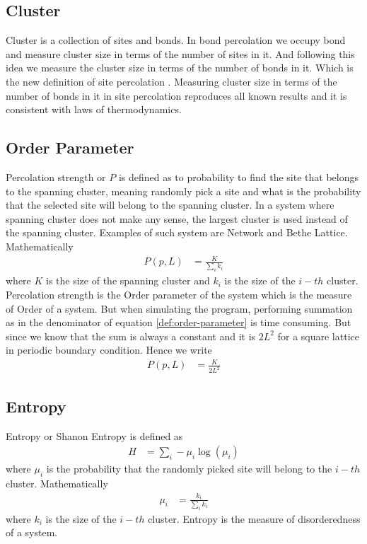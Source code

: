 	\subsection{Cluster}
	Cluster is a collection of sites and bonds. In bond percolation we occupy bond and measure cluster size in terms of the number of sites in it. And following this idea we measure the cluster size in terms of the number of bonds in it. Which is the new definition of site percolation \cite{redefinition-of-site-percolation}. Measuring cluster size in terms of the number of bonds in it in site percolation reproduces all known results and it is consistent with laws of thermodynamics.

	\subsection{Order Parameter}
	Percolation strength or $P$ is defined as to probability to find the site that belongs to the spanning cluster, meaning randomly pick a site and what is the probability that the selected site will belong to the spanning cluster. In a system where spanning cluster does not make any sense, the largest cluster is used instead of the spanning cluster. Examples of such system are Network and Bethe Lattice. Mathematically
	\begin{align}
		P(p,L) &= \frac{K}{\sum_{i} k_i}
		\label{def:order-parameter}
	\end{align}
	where $K$ is the size of the spanning cluster and $k_i$ is the size of the $i-th$ cluster.
	Percolation strength is the Order parameter of the system which is the measure of Order of a system.
	But when simulating the program, performing summation as in the denominator of equation \ref{def:order-parameter} is time consuming. But since we know that the sum is always a constant and it is $2 L^2$ for a square lattice in periodic boundary condition. Hence we write
	\begin{align}
		P(p,L)		 &= \frac{K}{2L^2}
		\label{def:order-parameter-2}
	\end{align}
	
	\subsection{Entropy}
	Entropy or Shanon Entropy is defined as
	\begin{align}
		H &= \sum_{i} - \mu_i \log(\mu_i)
	\end{align}
	where $\mu_i$ is the probability that the randomly picked site will belong to the $i-th$ cluster. Mathematically
	\begin{align}
		\mu_i &= \frac{k_i}{\sum_{i} k_i}
	\end{align}
	where	 $k_i$ is the size of the $i-th$ cluster.
	Entropy is the measure of disorderedness of a system.
	
